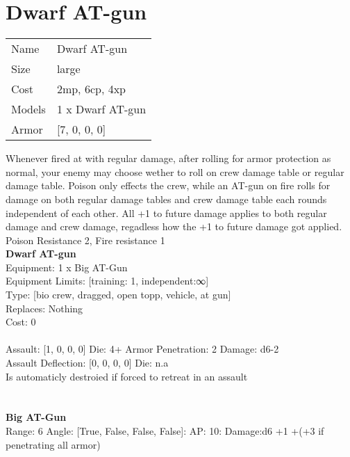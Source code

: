 \pagebreak\pagebreak

\section{ Dwarf AT-gun }

\begin{tabular}{ll}
  Name & Dwarf AT-gun \\
  Size & large\\
  Cost & 2mp, 6cp, 4xp\\
  Models & 1 x Dwarf AT-gun\\
  Armor & [7, 0, 0, 0]\\
\end{tabular}

\noindent Whenever fired at with regular damage, after rolling for armor protection as normal, your enemy may choose wether to roll on crew damage table or regular damage table. Poison only effects the crew, while an AT-gun on fire rolls for damage on both regular damage tables and crew damage table each rounds independent of each other. All +1 to future damage applies to both regular damage and crew damage, regadless how the +1 to future damage got applied.\\ 
 Poison Resistance 2, Fire resistance 1\\ 


{\bf Dwarf AT-gun } \\
Equipment: 1 x Big AT-Gun \\
Equipment Limits: [training: 1, independent:∞] \\
Type: [bio crew, dragged, open topp, vehicle, at gun] \\
Replaces: Nothing \\
Cost: 0\\
\ \\
Assault: [1, 0, 0, 0] Die: 4+ Armor Penetration: 2 Damage: d6-2 \\
Assault Deflection: [0, 0, 0, 0] Die: n.a\\
\indent Is automaticly destroied if forced to retreat in an assault\\ 
 
\ \\

\ \\
{\bf Big AT-Gun } \\



Range: 6  Angle: [True, False, False, False]: AP: 10: Damage:d6 +1 +(+3 if penetrating all armor) \\




